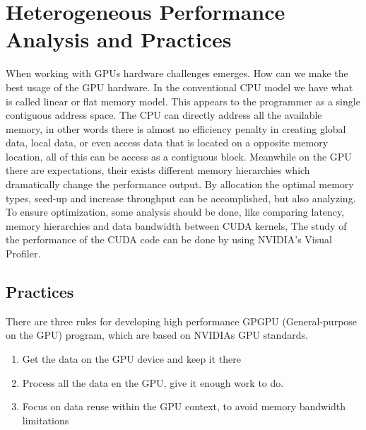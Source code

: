
\chapter{Heterogeneous Performance Analysis and Practices} %

\label{Heterogeneous Performance Analysis and Practices} %



When working with GPUs hardware challenges emerges. How can we make the best usage of the GPU hardware. In the conventional CPU model we have what is called linear or flat memory model. This appears to the programmer as a single contiguous address space. The CPU can directly address all the available memory, in other words there is almost no efficiency penalty in creating global data, local data, or even access data that is located on a opposite memory location, all of this can be access as a contiguous block. \cite{cook} Meanwhile on the GPU there are expectations, their exists different memory hierarchies which dramatically change the performance output. By allocation the optimal memory types, seed-up and increase throughput can be accomplished, but also analyzing. To ensure optimization, some analysis should be done, like comparing latency, memory hierarchies and data bandwidth between CUDA kernels, The study of the performance of the CUDA code can be done by using NVIDIA's Visual Profiler.


\section{Practices}

There are three rules for developing high performance GPGPU (General-purpose on the GPU) program, which are based on NVIDIAs GPU standards. \cite{design}

\begin{enumerate}
  \item Get the data on the GPU device and keep it there
  \item Process all the data en the GPU, give it enough work to do.
  \item Focus on data reuse within the GPU context, to avoid memory bandwidth limitations
\end{enumerate}

